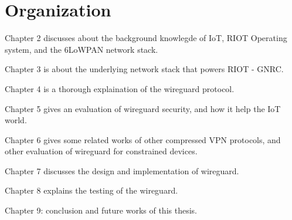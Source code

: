 \section{Organization}

  Chapter 2 discusses about the background knowlegde of IoT, RIOT Operating system, and the
  6LoWPAN network stack.

  Chapter 3 is about the underlying network stack that powers RIOT - GNRC.

  Chapter 4 is a thorough explaination of the wireguard protocol.

  Chapter 5 gives an evaluation of wireguard security, and how it help
  the IoT world.

  Chapter 6 gives some related works of other compressed VPN protocols, 
  and other evaluation of wireguard for constrained devices.

  Chapter 7 discusses the design and implementation of wireguard.

  Chapter 8 explains the testing of the wireguard.

  Chapter 9: conclusion and future works of this thesis.
